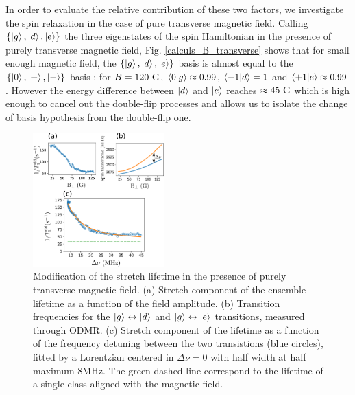 \documentclass[preprintnumbers,amsmath,amssymb,superscriptaddress,twocolumn,showpacs]{revtex4-2}
\begin{document}
In order to evaluate the relative contribution of these two factors, we investigate the spin relaxation in the case of pure transverse magnetic field. Calling $\{ \ket{g}, \ket{d}, \ket{e} \}$ the three eigenstates of the spin Hamiltonian in the presence of purely transverse magnetic field, Fig. \ref{calculs_B_transverse} shows that for small enough magnetic field, the $\{ \ket{g}, \ket{d}, \ket{e} \}$ basis is almost equal to the $\{ \ket{0},\ket{+},\ket{-} \} $ basis : for $B=120\ \rm G$, $\braket{0}{g}\approx 0.99$, $\braket{-1}{d}=1$ and $\braket{+1}{e}\approx 0.99$. However the energy difference between $\ket{d}$ and $\ket{e}$ reaches $\approx 45\ \rm G$ which is high enough to cancel out the double-flip processes and allows us to isolate the change of basis hypothesis from the double-flip one.

\begin{figure}
\includegraphics[width=0.45\textwidth]{Figures/fig transverse field}
\caption{Modification of the stretch lifetime in the presence of purely transverse magnetic field. (a) Stretch component of the ensemble lifetime as a function of the field amplitude. (b) Transition frequencies for the $\ket{g} \leftrightarrow \ket{d}$ and $\ket{g} \leftrightarrow \ket{e}$ transitions, measured through ODMR. (c) Stretch component of the lifetime as a function of the frequency detuning between the two transistions (blue circles), fitted by a Lorentzian centered in $\Delta \nu=0$ with half width at half maximum 8MHz. The green dashed line correspond to the lifetime of a single class aligned with the magnetic field.}
\label{exp_B_transverse}
\end{figure}
\end{document}
